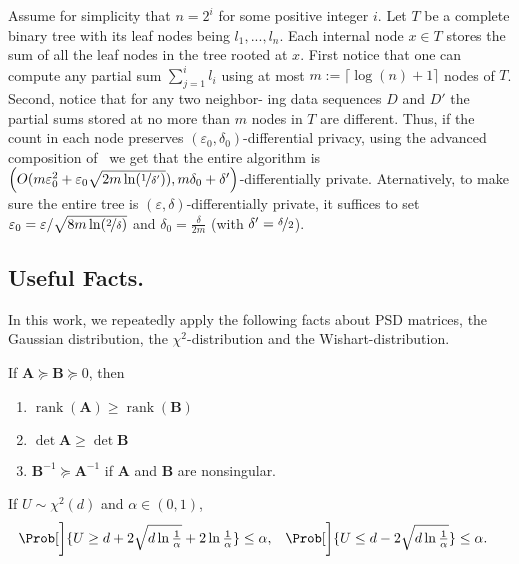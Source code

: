 \documentclass{article}
\renewcommand{\vec}[1]{\bm{#1}}
\newcommand{\inv}[1]{#1^{-1}}
\newcommand{\rank}{\operatorname{rank}}
\renewcommand{\det}{\operatorname{det}}
\begin{document}
Assume for simplicity that $n=2^i$ for some positive integer $i$. Let $T$ be a complete binary tree with its leaf nodes being $l_1,...,l_n$. Each internal
node $x\in T$ stores the sum of all the leaf nodes in the tree
rooted at $x$. First notice that one can compute any partial sum $\sum_{j=1}^i l_i$ using at most $m:=\lceil\log(n)+1\rceil$ nodes of $T$. Second, notice that for any two neighbor-
ing data sequences $D$ and $D'$ the partial sums stored at no more than $m$ nodes in $T$ are different. Thus, if the count in each node preserves $(\varepsilon_0,\delta_0)$-differential privacy, using the advanced composition of~\cite{DworkBoosting2010} we get that the entire algorithm is $\left(O(m\varepsilon_0^2+\varepsilon_0\sqrt{2m\ln(\nicefrac 1{\delta'})}), m\delta_0 + \delta'\right)$-differentially private. Aternatively, to make sure the entire tree is $(\varepsilon,\delta)$-differentially private, it suffices to set $\varepsilon_0 = \varepsilon / \sqrt{8m\ln(\nicefrac 2 \delta)}$ and $\delta_0= \tfrac \delta{2m}$ (with $\delta'=\nicefrac \delta 2$).

\subsection{Useful Facts.}
\label{apx_subsec:facts}

In this work, we repeatedly apply the following facts about PSD matrices, the Gaussian distribution, the $\chi^2$-distribution and the Wishart-distribution.

\begin{claim}%
  \label{claim:psd-matrix-props}%
  If $\vec A \succeq \vec B \succeq 0$, then
  \begin{enumerate}[nolistsep]
  \item $\rank(\vec A) \ge \rank(\vec B)$
  \item $\det \vec A \ge \det \vec B$
  \item $\inv{\vec B} \succeq \inv{\vec A}$ if $\vec A$ and $\vec B$ are nonsingular.
  \end{enumerate}
\end{claim}

\begin{claim}%
  \label{claim:chi2-tails}
  If $U\sim\chi^2(d)$ and $\alpha\in(0,1)$,
  \begin{align*}
    \Prob[\bigg]{U \ge d + 2\sqrt{d\ln\tfrac{1}{\alpha}} + 2\ln\tfrac{1}{\alpha}} &\le \alpha,
    & \Prob[\bigg]{U \le d - 2\sqrt{d\ln\tfrac{1}{\alpha}}} &\le \alpha.
  \end{align*}
\end{claim}
\end{document}
